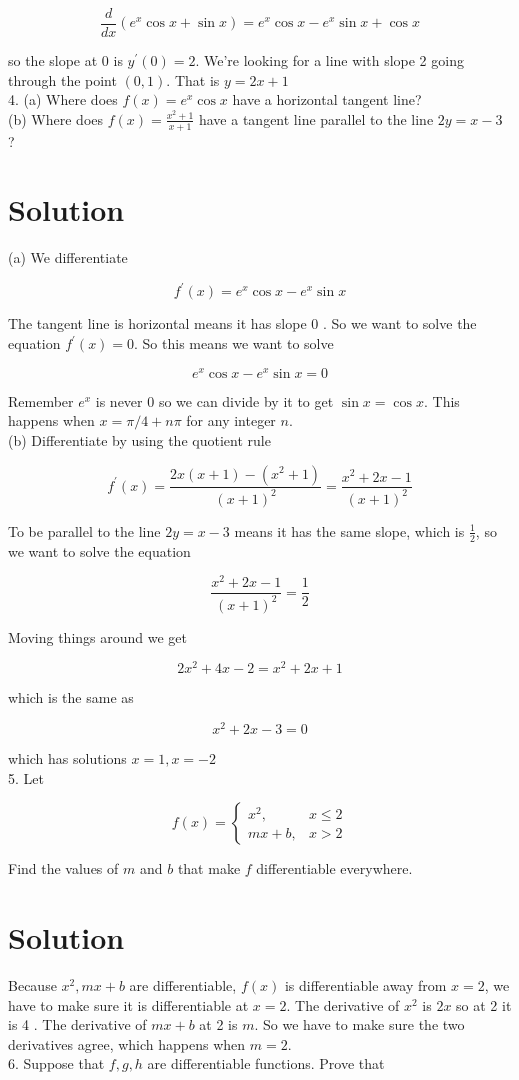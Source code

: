 \documentclass[10pt]{article}
\begin{document}
$$
\frac{d}{d x}\left(e^{x} \cos x+\sin x\right)=e^{x} \cos x-e^{x} \sin x+\cos x
$$

so the slope at 0 is $y^{\prime}(0)=2$. We're looking for a line with slope 2 going through the point $(0,1)$. That is $y=2 x+1$\\
4. (a) Where does $f(x)=e^{x} \cos x$ have a horizontal tangent line?\\
(b) Where does $f(x)=\frac{x^{2}+1}{x+1}$ have a tangent line parallel to the line $2 y=x-3$ ?

\section*{Solution}
(a) We differentiate

$$
f^{\prime}(x)=e^{x} \cos x-e^{x} \sin x
$$

The tangent line is horizontal means it has slope 0 . So we want to solve the equation $f^{\prime}(x)=0$. So this means we want to solve

$$
e^{x} \cos x-e^{x} \sin x=0
$$

Remember $e^{x}$ is never 0 so we can divide by it to get $\sin x=\cos x$. This happens when $x=\pi / 4+n \pi$ for any integer $n$.\\
(b) Differentiate by using the quotient rule

$$
f^{\prime}(x)=\frac{2 x(x+1)-\left(x^{2}+1\right)}{(x+1)^{2}}=\frac{x^{2}+2 x-1}{(x+1)^{2}}
$$

To be parallel to the line $2 y=x-3$ means it has the same slope, which is $\frac{1}{2}$, so we want to solve the equation

$$
\frac{x^{2}+2 x-1}{(x+1)^{2}}=\frac{1}{2}
$$

Moving things around we get

$$
2 x^{2}+4 x-2=x^{2}+2 x+1
$$

which is the same as

$$
x^{2}+2 x-3=0
$$

which has solutions $x=1, x=-2$\\
5. Let

$$
f(x)= \begin{cases}x^{2}, & x \leq 2 \\ m x+b, & x>2\end{cases}
$$

Find the values of $m$ and $b$ that make $f$ differentiable everywhere.

\section*{Solution}
Because $x^{2}, m x+b$ are differentiable, $f(x)$ is differentiable away from $x=2$, we have to make sure it is differentiable at $x=2$. The derivative of $x^{2}$ is $2 x$ so at 2 it is 4 . The derivative of $m x+b$ at 2 is $m$. So we have to make sure the two derivatives agree, which happens when $m=2$.\\
6. Suppose that $f, g, h$ are differentiable functions. Prove that
\end{document}
